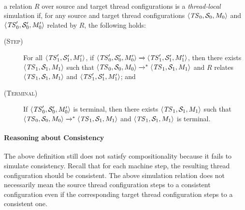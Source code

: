 \paragraph{}

a relation $R$ over source and target thread configurations is a \emph{thread-local} simulation if,
for any source and target thread configurations ${\langle{\mathit{TS}_0,{\cal S}_0,M_0}\rangle}$ and
${\langle{\mathit{TS}'_0,{\cal S}'_0,M'_0}\rangle}$ related by $R$, the following holds:
\begin{description}
\item[\textsc{(Step)}] For all ${\langle{\mathit{TS}'_1,{\cal S}'_1,M'_1}\rangle}$, if
  ${\langle{\mathit{TS}'_0,{\cal S}'_0,M'_0}\rangle} \xrightarrow{} {\langle{\mathit{TS}'_1,{\cal S}'_1,M'_1}\rangle}$, then there exists
  ${\langle{\mathit{TS}_1,{\cal S}_1,M_1}\rangle}$ such that
  ${\langle{\mathit{TS}_0,{\cal S}_0,M_0}\rangle} \xrightarrow{}^* {\langle{\mathit{TS}_1,{\cal S}_1,M_1}\rangle}$ and $R$ relates
  ${\langle{\mathit{TS}_1,{\cal S}_1,M_1}\rangle}$ and ${\langle{\mathit{TS}'_1,{\cal S}'_1,M'_1}\rangle}$; and
\item[\textsc{(Terminal)}] If ${\langle{\mathit{TS}'_0,{\cal S}'_0,M'_0}\rangle}$ is terminal, then there exists
  ${\langle{\mathit{TS}_1,{\cal S}_1,M_1}\rangle}$ such that
  ${\langle{\mathit{TS}_0,{\cal S}_0,M_0}\rangle} \xrightarrow{}^* {\langle{\mathit{TS}_1,{\cal S}_1,M_1}\rangle}$ and
  ${\langle{\mathit{TS}_1,{\cal S}_1,M_1}\rangle}$ is terminal.
\end{description}


\paragraph{Reasoning about Consistency}

The above definition still does not satisfy compositionality because it fails to simulate
consistency.  Recall that for each machine step, the resulting thread configuration should be
consistent.  The above simulation relation does not necessarily mean the source thread configuration
steps to a consistent configuration even if the corresponding target thread configuration steps to a
consistent one.

